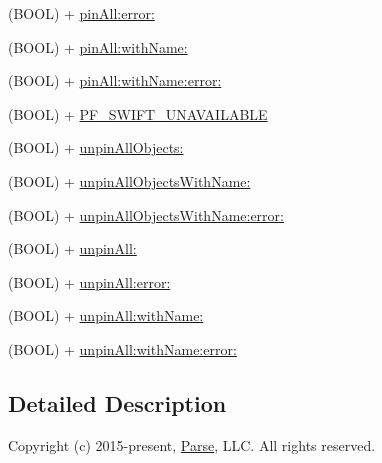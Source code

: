 \begin{DoxyCompactItemize}
\begin{DoxyCompactList}
 \end{DoxyCompactList}\item 
(B\+O\+O\+L) + \hyperlink{category_p_f_object_07_synchronous_08_a6243b032f205d831b46c537493bc39b7}{pin\+All\+:error\+:}
\item 
(B\+O\+O\+L) + \hyperlink{category_p_f_object_07_synchronous_08_ab30f02bb742052101f4f30b0ed040a1e}{pin\+All\+:with\+Name\+:}
\item 
(B\+O\+O\+L) + \hyperlink{category_p_f_object_07_synchronous_08_a2fad89c6478357f05197959283d75455}{pin\+All\+:with\+Name\+:error\+:}
\item 
(B\+O\+O\+L) + \hyperlink{category_p_f_object_07_synchronous_08_adbd353cd498462b7749c7a2ad0d745d0}{P\+F\+\_\+\+S\+W\+I\+F\+T\+\_\+\+U\+N\+A\+V\+A\+I\+L\+A\+B\+L\+E}
\begin{DoxyCompactList}\small\item\em 

 \end{DoxyCompactList}\item 
(B\+O\+O\+L) + \hyperlink{category_p_f_object_07_synchronous_08_a33f9eafdd59ab82e10b47524a039c73f}{unpin\+All\+Objects\+:}
\item 
(B\+O\+O\+L) + \hyperlink{category_p_f_object_07_synchronous_08_a938bbda1e7d1af59c9939be61131a744}{unpin\+All\+Objects\+With\+Name\+:}
\item 
(B\+O\+O\+L) + \hyperlink{category_p_f_object_07_synchronous_08_abfa4f1d7765483d99d3c9fbbefa784bd}{unpin\+All\+Objects\+With\+Name\+:error\+:}
\item 
(B\+O\+O\+L) + \hyperlink{category_p_f_object_07_synchronous_08_aaccc527f6232d2d87398d6cd27f55f06}{unpin\+All\+:}
\item 
(B\+O\+O\+L) + \hyperlink{category_p_f_object_07_synchronous_08_ace10cf5be427fbcce1364e2223da527c}{unpin\+All\+:error\+:}
\item 
(B\+O\+O\+L) + \hyperlink{category_p_f_object_07_synchronous_08_a1134dbdf7ef51d9eef9e869aae08abc4}{unpin\+All\+:with\+Name\+:}
\item 
(B\+O\+O\+L) + \hyperlink{category_p_f_object_07_synchronous_08_a38758ee3650df7b75c2f5564bea0aaee}{unpin\+All\+:with\+Name\+:error\+:}
\end{DoxyCompactItemize}


\subsection{Detailed Description}
Copyright (c) 2015-\/present, \hyperlink{interface_parse}{Parse}, L\+L\+C. All rights reserved.

